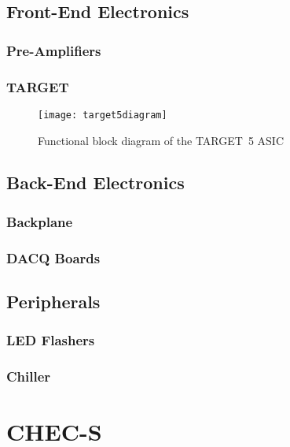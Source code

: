 \subsection{Front-End Electronics}

\subsubsection{Pre-Amplifiers}

\subsubsection{TARGET}

\begin{figure}
	\centering\texttt{[image: target5diagram]} 
	\caption[Functional block diagram of the TARGET~5 ASIC.]{Functional block diagram of the TARGET~5 ASIC \cite{Albert2017} }
	\label{fig:target5diagram}
\end{figure}

\subsection{Back-End Electronics}

\subsubsection{Backplane}

\subsubsection{DACQ Boards}

\subsection{Peripherals}

\subsubsection{LED Flashers}

\subsubsection{Chiller}

\section{CHEC-S}

